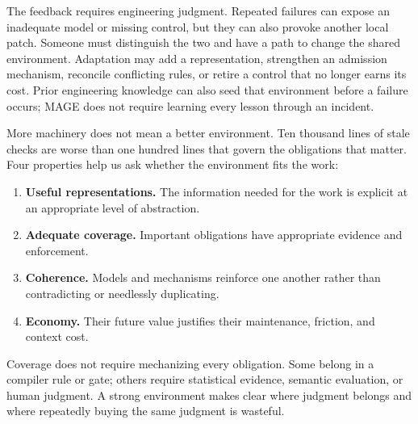 
The feedback requires engineering judgment. Repeated failures can expose an inadequate model or missing control, but they can also provoke another local patch. Someone must distinguish the two and have a path to change the shared environment. Adaptation may add a representation, strengthen an admission mechanism, reconcile conflicting rules, or retire a control that no longer earns its cost. Prior engineering knowledge can also seed that environment before a failure occurs; MAGE does not require learning every lesson through an incident.



More machinery does not mean a better environment. Ten thousand lines of stale checks are worse than one hundred lines that govern the obligations that matter. Four properties help us ask whether the environment fits the work:

\begin{enumerate}
\tightlist
\item \textbf{Useful representations.} The information needed for the work is explicit at an appropriate level of abstraction.
\item \textbf{Adequate coverage.} Important obligations have appropriate evidence and enforcement.
\item \textbf{Coherence.} Models and mechanisms reinforce one another rather than contradicting or needlessly duplicating.
\item \textbf{Economy.} Their future value justifies their maintenance, friction, and context cost.
\end{enumerate}

Coverage does not require mechanizing every obligation. Some belong in a compiler rule or gate; others require statistical evidence, semantic evaluation, or human judgment. A strong environment makes clear where judgment belongs and where repeatedly buying the same judgment is wasteful.


